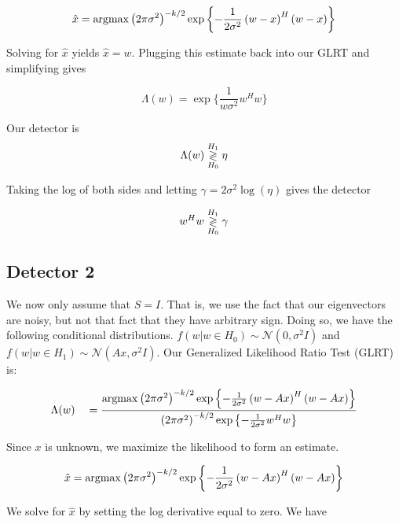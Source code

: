 \documentclass[english]{article}
\begin{document}
\begin{equation}
\hat{x}=\mathop{\rm argmax}\left(2\pi\sigma^2\right)^{-k/2}\exp\left\{-\frac{1}{2\sigma^2}\left(w-x\right)^H\left(w-x\right)\right\}
\end{equation}

Solving for $\hat{x}$ yields $\hat{x} = w$. Plugging this estimate back into our GLRT and simplifying gives

\begin{equation}
\Lambda(w)=\exp\{\frac{1}{w\sigma^2}w^Hw\}
\end{equation}

Our detector is
\begin{equation}
\Lambda(w) \overset{H_1}{\underset{H_0}{\gtrless}} \eta
\end{equation}

Taking the log of both sides and letting $\gamma = 2\sigma^2\log(\eta)$ gives the detector

\begin{equation}
w^Hw \overset{H_1}{\underset{H_0}{\gtrless}}\gamma
\end{equation}

\subsection{Detector 2}
We now only assume that $S=I$. That is, we use the fact that our eigenvectors are noisy, but not that fact that they have arbitrary sign. Doing so, we have the following conditional distributions. $f(w|w\in H_0)\sim\mathcal{N}(0,\sigma^2I)$ and $f(w|w\in H_1)\sim\mathcal{N}(Ax,\sigma^2I)$. Our Generalized Likelihood Ratio Test (GLRT) is:

\begin{equation}
\begin{aligned}
&\Lambda(w)
&&=\frac{\mathop{\rm argmax}\left(2\pi\sigma^2\right)^{-k/2}\exp\left\{-\frac{1}{2\sigma^2}\left(w-Ax\right)^H\left(w-Ax\right)\right\}}{\left(2\pi\sigma^2\right)^{-k/2}\exp\left\{-\frac{1}{2\sigma^2}w^Hw\right\}}\\
\end{aligned}
\end{equation}

Since $x$ is unknown, we maximize the likelihood to form an estimate.

\begin{equation}
\hat{x}=\mathop{\rm argmax}\left(2\pi\sigma^2\right)^{-k/2}\exp\left\{-\frac{1}{2\sigma^2}\left(w-Ax\right)^H\left(w-Ax\right)\right\}
\end{equation}

We solve for $\hat{x}$ by setting the log derivative equal to zero. We have
\end{document}
